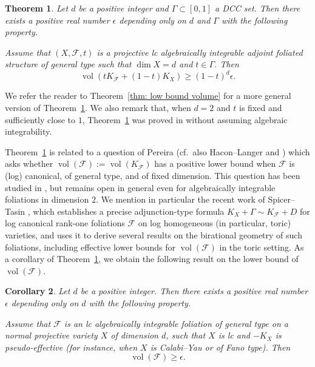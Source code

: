 \documentclass[11pt,reqno]{amsart}
\numberwithin{equation}{section}
\newcommand{\vol}{\operatorname{vol}}
\newcommand{\Ff}{\mathcal{F}}
\newcommand{\Ii}{\Gamma}
\newtheorem{thm}{Theorem}[section]
\newtheorem{cor}[thm]{Corollary}
\theoremstyle{definition}
\begin{document}
\begin{thm}\label{thm: volume lower bound}
    Let $d$ be a positive integer and $\Ii\subset [0,1]$ a DCC set. Then there exists a positive real number $\epsilon$ depending only on $d$ and $\Ii$ with the following property. 
    
    Assume that $(X,\Ff,t)$ is a projective lc algebraically integrable adjoint foliated structure of general type such that $\dim X=d$ and $t\in\Ii$. Then
    $$\vol(tK_{\Ff}+(1-t)K_X)\geq (1-t)^d\epsilon.$$
\end{thm}

We refer the reader to Theorem~\ref{thm: low bound volume} for a more general version of Theorem~\ref{thm: volume lower bound}. We also remark that, when $d=2$ and $t$ is fixed and sufficiently close to $1$, Theorem~\ref{thm: volume lower bound} was proved in \cite[Theorem~1.5]{SS23} without assuming algebraic integrability.

Theorem~\ref{thm: volume lower bound} is related to a question of 
Pereira 
(cf.\ also Hacon--Langer \cite[Question~4]{HL21} and \cite[Section~3]{Cas21}) which asks whether $\vol(\Ff):=\vol(K_{\Ff})$ has a positive lower bound when $\Ff$ is (log) canonical, of general type, and of fixed dimension. This question has been studied in \cite{PS19,Che21,HL21,LT22,SS23,HJLL24,CPT25,Fan25,ST26}, but remains open in general even for algebraically integrable foliations in dimension $2$. We mention in particular the recent work of Spicer--Tasin \cite{ST26}, which establishes a precise adjunction-type formula $K_X+\Gamma\sim K_{\Ff}+D$ for log canonical rank-one foliations $\Ff$ on log homogeneous (in particular, toric) varieties, and uses it to derive several results on the birational geometry of such foliations, including effective lower bounds for $\vol(\Ff)$ in the toric setting. As a corollary of Theorem~\ref{thm: volume lower bound}, we obtain the following result on the lower bound of $\vol(\Ff)$.

\begin{cor}\label{cor: low bound volume}
Let $d$ be a positive integer. Then there exists a positive real number $\epsilon$ depending only on $d$ with the following property. 

Assume that $\Ff$
is an lc algebraically integrable foliation of general type on a normal projective variety $X$ of dimension $d$, such that $X$ is lc and $-K_X$ is pseudo-effective (for instance, when $X$ is Calabi--Yau or of Fano type). Then 
$$\vol(\Ff)\geq\epsilon.$$
\end{cor}
\end{document}
